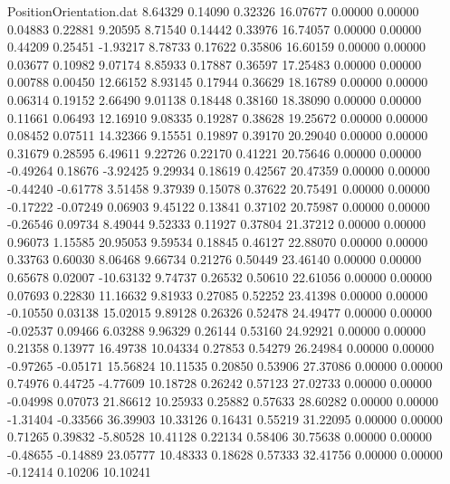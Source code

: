 \begin{filecontents}{PositionOrientation.dat}
   8.64329    0.14090    0.32326    16.07677    0.00000    0.00000    0.04883    0.22881    9.20595
   8.71540    0.14442    0.33976    16.74057    0.00000    0.00000    0.44209    0.25451   -1.93217
   8.78733    0.17622    0.35806    16.60159    0.00000    0.00000    0.03677    0.10982    9.07174
   8.85933    0.17887    0.36597    17.25483    0.00000    0.00000    0.00788    0.00450   12.66152
   8.93145    0.17944    0.36629    18.16789    0.00000    0.00000    0.06314    0.19152    2.66490
   9.01138    0.18448    0.38160    18.38090    0.00000    0.00000    0.11661    0.06493   12.16910
   9.08335    0.19287    0.38628    19.25672    0.00000    0.00000    0.08452    0.07511   14.32366
   9.15551    0.19897    0.39170    20.29040    0.00000    0.00000    0.31679    0.28595    6.49611
   9.22726    0.22170    0.41221    20.75646    0.00000    0.00000   -0.49264    0.18676   -3.92425
   9.29934    0.18619    0.42567    20.47359    0.00000    0.00000   -0.44240   -0.61778    3.51458
   9.37939    0.15078    0.37622    20.75491    0.00000    0.00000   -0.17222   -0.07249    0.06903
   9.45122    0.13841    0.37102    20.75987    0.00000    0.00000   -0.26546    0.09734    8.49044
   9.52333    0.11927    0.37804    21.37212    0.00000    0.00000    0.96073    1.15585   20.95053
   9.59534    0.18845    0.46127    22.88070    0.00000    0.00000    0.33763    0.60030    8.06468
   9.66734    0.21276    0.50449    23.46140    0.00000    0.00000    0.65678    0.02007  -10.63132
   9.74737    0.26532    0.50610    22.61056    0.00000    0.00000    0.07693    0.22830   11.16632
   9.81933    0.27085    0.52252    23.41398    0.00000    0.00000   -0.10550    0.03138   15.02015
   9.89128    0.26326    0.52478    24.49477    0.00000    0.00000   -0.02537    0.09466    6.03288
   9.96329    0.26144    0.53160    24.92921    0.00000    0.00000    0.21358    0.13977   16.49738
  10.04334    0.27853    0.54279    26.24984    0.00000    0.00000   -0.97265   -0.05171   15.56824
  10.11535    0.20850    0.53906    27.37086    0.00000    0.00000    0.74976    0.44725   -4.77609
  10.18728    0.26242    0.57123    27.02733    0.00000    0.00000   -0.04998    0.07073   21.86612
  10.25933    0.25882    0.57633    28.60282    0.00000    0.00000   -1.31404   -0.33566   36.39903
  10.33126    0.16431    0.55219    31.22095    0.00000    0.00000    0.71265    0.39832   -5.80528
  10.41128    0.22134    0.58406    30.75638    0.00000    0.00000   -0.48655   -0.14889   23.05777
  10.48333    0.18628    0.57333    32.41756    0.00000    0.00000   -0.12414    0.10206   10.10241

\end{filecontents}
